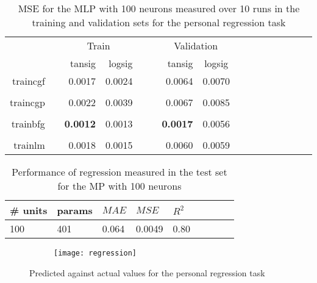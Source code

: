 \documentclass[conference,compsoc]{IEEEtran}
\begin{document}
\begin{table*}\centering
\begin{tabular}{@{}rrrrrrrccrrrcrrr@{}}\toprule
& \multicolumn{4}{c}{Train} & \phantom{abc}& \multicolumn{2}{c}{Validation} &
\phantom{abc} \\
\cmidrule{2-5} \cmidrule{7-9} \cmidrule{10-12}
&  & tansig & logsig    &&  & tansig &   logsig \\ \midrule
traincgf && 0.0017 & 0.0024 && &0.0064& 0.0070\\
\\
traincgp && 0.0022&0.0039&&&0.0067&0.0085\\
\\


trainbfg&&\textbf{0.0012}&0.0013&&&\textbf{ 0.0017}&0.0056\\
\\
trainlm&&0.0018&0.0015&&& 0.0060&0.0059\\
 
\bottomrule
\end{tabular}
\caption{MSE for the MLP with 100 neurons measured over 10 runs in the training and validation sets for the personal regression task}
       \label{tbl:reg1}
\end{table*}


   
\begin{table*}
\centering
\begin{subtable}[t]{0.4\textwidth}

\begin{tabular}[t]{l l l l l l l l l}
\toprule

\# units & params &$MAE$ &   $MSE$  &$R^2$\\
\midrule

                        
 100 & 401 &0.064 & 0.0049& 0.80 \\

\bottomrule
\end{tabular}
\end{subtable}
\caption{Performance of regression measured in the test set for the MP with 100 neurons
 }
\label{fig:reg}
\end{table*}

   \begin{figure*}[]
        \centering
        \begin{subfigure}{0.4\linewidth}
            \texttt{[image: regression]}

        \end{subfigure}
    
        
        \caption{Predicted against actual values for the personal regression task}
        \label{fig:regsum}
\end{figure*}
\end{document}
